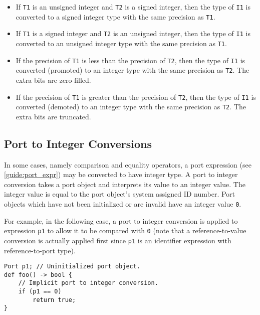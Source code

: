 \begin{itemize}
\item If \texttt{T1} is an unsigned integer and \texttt{T2} is a signed integer, then the type of \texttt{I1} is converted to a signed integer type with the same precision as \texttt{T1}.

\item If \texttt{T1} is a signed integer and \texttt{T2} is an unsigned integer, then the type of \texttt{I1} is converted to an unsigned integer type with the same precision as \texttt{T1}.

\item If the precision of \texttt{T1} is less than the precision of \texttt{T2}, then the type of \texttt{I1} is converted (promoted) to an integer type with the same precision as \texttt{T2}. The extra bits are zero-filled.

\item If the precision of \texttt{T1} is greater than the precision of \texttt{T2}, then the type of \texttt{I1} is converted (demoted) to an integer type with the same precision as \texttt{T2}. The extra bits are truncated.
\end{itemize}

\subsection{Port to Integer Conversions} \label{guide:port_conv}

In some cases, namely comparison and equality operators, a port expression (see \ref{guide:port_expr}) may be converted to have integer type. A port to integer conversion takes a port object and interprets its value to an integer value. The integer value is equal to the port object's system assigned ID number. Port objects which have not been initialized or are invalid have an integer value \texttt{0}.

For example, in the following case, a port to integer conversion is applied to expression \texttt{p1} to allow it to be compared with \texttt{0} (note that a reference-to-value conversion is actually applied first since \texttt{p1} is an identifier expression with reference-to-port type).

\begin{minip}
\begin{lstlisting}
Port p1; // Uninitialized port object.
def foo() -> bool {
	// Implicit port to integer conversion.
	if (p1 == 0)
		return true;
}
\end{lstlisting}
\end{minip}

